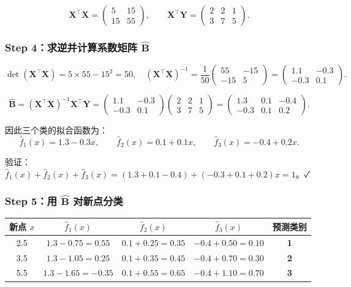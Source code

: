 \[
\mathbf{X}^\top\mathbf{X} = 
\begin{pmatrix}
5 & 15 \\
15 & 55
\end{pmatrix},
\qquad
\mathbf{X}^\top\mathbf{Y} = 
\begin{pmatrix}
2 & 2 & 1 \\
3 & 7 & 5
\end{pmatrix}.
\]

\subsubsection{Step 4：求逆并计算系数矩阵 $\hat{\mathbf{B}}$}

\[
\det(\mathbf{X}^\top\mathbf{X}) = 5 \times 55 - 15^2 = 50,
\quad
(\mathbf{X}^\top\mathbf{X})^{-1} = \frac{1}{50}
\begin{pmatrix}
55 & -15 \\
-15 & 5
\end{pmatrix}
= \begin{pmatrix}
1.1 & -0.3 \\
-0.3 & 0.1
\end{pmatrix}.
\]

\[
\hat{\mathbf{B}} = (\mathbf{X}^\top\mathbf{X})^{-1}\mathbf{X}^\top\mathbf{Y}
= \begin{pmatrix}
1.1 & -0.3 \\
-0.3 & 0.1
\end{pmatrix}
\begin{pmatrix}
2 & 2 & 1 \\
3 & 7 & 5
\end{pmatrix}
= \begin{pmatrix}
1.3 & 0.1 & -0.4 \\
-0.3 & 0.1 & 0.2
\end{pmatrix}.
\]

因此三个类的拟合函数为：
\[
\hat{f}_1(x) = 1.3 - 0.3x,\qquad
\hat{f}_2(x) = 0.1 + 0.1x,\qquad
\hat{f}_3(x) = -0.4 + 0.2x.
\]

验证：$\hat{f}_1(x)+\hat{f}_2(x)+\hat{f}_3(x) = (1.3+0.1-0.4) + (-0.3+0.1+0.2)x = 1$。✓

\subsubsection{Step 5：用 $\hat{\mathbf{B}}$ 对新点分类}

\begin{center}
\begin{tabular}{c|c|c|c|c}
\hline
新点 $x$ & $\hat{f}_1(x)$ & $\hat{f}_2(x)$ & $\hat{f}_3(x)$ & 预测类别 \\
\hline
2.5 & $1.3 - 0.75 = 0.55$ & $0.1 + 0.25 = 0.35$ & $-0.4 + 0.50 = 0.10$ & \textbf{1} \\
3.5 & $1.3 - 1.05 = 0.25$ & $0.1 + 0.35 = 0.45$ & $-0.4 + 0.70 = 0.30$ & \textbf{2} \\
5.5 & $1.3 - 1.65 = -0.35$ & $0.1 + 0.55 = 0.65$ & $-0.4 + 1.10 = 0.70$ & \textbf{3} \\
\hline
\end{tabular}
\end{center}

